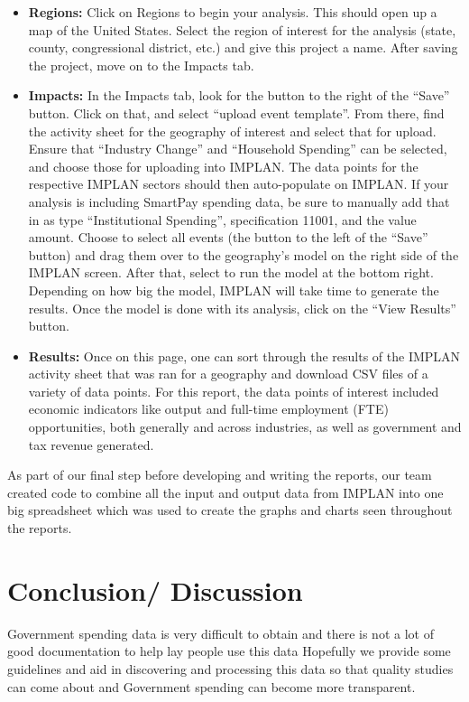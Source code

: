 \documentclass[
]{book}
\begin{document}
\begin{itemize}
\item
  \textbf{Regions:} Click on Regions to begin your analysis. This should open up a map of the United States. Select the region of interest for the analysis (state, county, congressional district, etc.) and give this project a name. After saving the project, move on to the Impacts tab.
\item
  \textbf{Impacts:} In the Impacts tab, look for the button to the right of the ``Save'' button. Click on that, and select ``upload event template''. From there, find the activity sheet for the geography of interest and select that for upload. Ensure that ``Industry Change'' and ``Household Spending'' can be selected, and choose those for uploading into IMPLAN. The data points for the respective IMPLAN sectors should then auto-populate on IMPLAN. If your analysis is including SmartPay spending data, be sure to manually add that in as type ``Institutional Spending'', specification 11001, and the value amount. Choose to select all events (the button to the left of the ``Save'' button) and drag them over to the geography's model on the right side of the IMPLAN screen. After that, select to run the model at the bottom right. Depending on how big the model, IMPLAN will take time to generate the results. Once the model is done with its analysis, click on the ``View Results'' button.
\item
  \textbf{Results:} Once on this page, one can sort through the results of the IMPLAN activity sheet that was ran for a geography and download CSV files of a variety of data points. For this report, the data points of interest included economic indicators like output and full-time employment (FTE) opportunities, both generally and across industries, as well as government and tax revenue generated.
\end{itemize}

As part of our final step before developing and writing the reports, our team created code to combine all the input and output data from IMPLAN into one big spreadsheet which was used to create the graphs and charts seen throughout the reports.

\hypertarget{conclusion-discussion}{%
\chapter{Conclusion/ Discussion}\label{conclusion-discussion}}

Government spending data is very difficult to obtain and there is not a lot of good documentation to help lay people use this data
Hopefully we provide some guidelines and aid in discovering and processing this data so that quality studies can come about and
Government spending can become more transparent.
\end{document}
